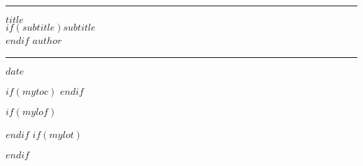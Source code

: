 \setlength\parindent{0pt}      %
\begin{titlepage}
\begin{center}
\noindent\rule[1ex]{\textwidth}{0.5pt}
 \Huge \textbf{$title$}\\
 $if(subtitle)$\huge $subtitle$\\$endif$
  \Large $author$
\end{center}
\noindent\rule[1ex]{\textwidth}{0.5pt}

\vspace{26mm}
\normalsize
{\centering
\vfill
\scriptsize $date$\normalsize

}
\thispagestyle{empty}
\end{titlepage}

\clearpage
{}



{
\hypersetup{linkcolor=HSNRblue1}
\setcounter{tocdepth}{2}
$if(mytoc)$
\tableofcontents
$endif$
}

$if(mylof)$
\listoffigures
$endif$
$if(mylot)$
\listoftables
$endif$
\clearpage
{}
\clearpairofpagestyles
\ihead{}
\ohead{\rightmark}
\ofoot*{\footnotesize\pagemark}

